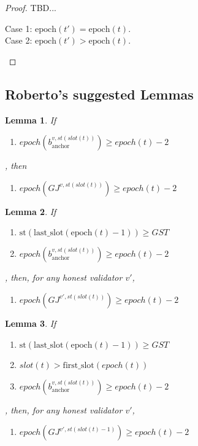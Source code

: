 \documentclass{article}
\newtheorem{lemma}{Lemma}
\begin{document}
\begin{proof}
    TBD...

    \begin{description}
        \item[Case 1: $\text{epoch}(t') = \text{epoch}(t)$.]
        \item[Case 2: $\text{epoch}(t') > \text{epoch}(t)$.]  
    \end{description}
\end{proof}

\subsection*{Roberto's suggested Lemmas}

\begin{lemma}
    If
    \begin{enumerate}
        \item $epoch(b_{\text{anchor}}^{v,st(slot(t))}) \geq epoch(t)-2$
    \end{enumerate},
    then
    \begin{enumerate}
        \item $epoch(GJ^{v,st(slot(t))}) \geq epoch(t)-2$
    \end{enumerate}
\end{lemma}

\begin{lemma}
    If
    \begin{enumerate}
        \item $\text{st}(\text{last\_slot}(\text{epoch}(t) - 1)) \geq GST$
        \item $epoch(b_{\text{anchor}}^{v,st(slot(t))}) \geq epoch(t)-2$
    \end{enumerate},
    then, for any honest validator $v'$,
    \begin{enumerate}
        \item $epoch(GJ^{v',st(slot(t))}) \geq epoch(t)-2$
    \end{enumerate}
\end{lemma}

\begin{lemma}\label{lem:gj-at-least-e-2}
    If
    \begin{enumerate}
        \item $\text{st}(\text{last\_slot}(\text{epoch}(t) - 1)) \geq GST$
        \item $slot(t) > \text{first\_slot}(epoch(t))$
        \item $epoch(b_{\text{anchor}}^{v,st(slot(t))}) \geq epoch(t)-2$
    \end{enumerate},
    then, for any honest validator $v'$,
    \begin{enumerate}
        \item $epoch(GJ^{v',st(slot(t)-1)}) \geq epoch(t)-2$
    \end{enumerate}
\end{lemma}
\end{document}
